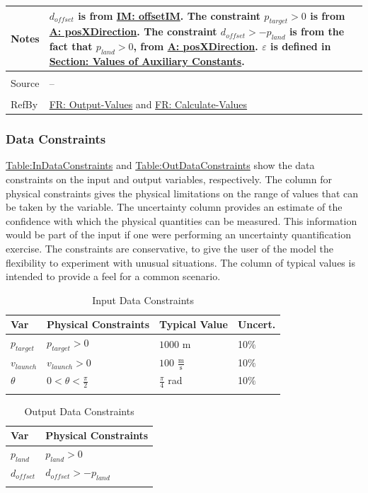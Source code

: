 \documentclass[12pt]{article}
\begin{document}
\begin{minipage}{\textwidth}
\begin{tabular}{p{} p{}}
Notes & ${d_{offset}}$ is from \hyperref[IM:offsetIM]{IM: offsetIM}.
        The constraint ${p_{target}}>0$ is from \hyperref[posXDirection]{A: posXDirection}.
        The constraint ${d_{offset}}>-{p_{land}}$ is from the fact that ${p_{land}}>0$, from \hyperref[posXDirection]{A: posXDirection}.
        $ε$ is defined in \hyperref[Sec:AuxConstants]{Section: Values of Auxiliary Constants}.
\\ \midrule \\
Source & --
\\ \midrule \\
RefBy & \hyperref[outputValues]{FR: Output-Values} and \hyperref[calcValues]{FR: Calculate-Values}
\\ \bottomrule \end{tabular}
\end{minipage}
\subsubsection{Data Constraints}
\label{Sec:DataConstraints}
\hyperref[Table:InDataConstraints]{Table:InDataConstraints} and \hyperref[Table:OutDataConstraints]{Table:OutDataConstraints} show the data constraints on the input and output variables, respectively. The column for physical constraints gives the physical limitations on the range of values that can be taken by the variable. The uncertainty column provides an estimate of the confidence with which the physical quantities can be measured. This information would be part of the input if one were performing an uncertainty quantification exercise. The constraints are conservative, to give the user of the model the flexibility to experiment with unusual situations. The column of typical values is intended to provide a feel for a common scenario.
\begin{longtable}{l l l l}
\toprule
Var & Physical Constraints & Typical Value & Uncert.
\\
\midrule
\endhead
${p_{target}}$ & ${p_{target}}>0$ & $1000$ m & 10$\%$
\\
${v_{launch}}$ & ${v_{launch}}>0$ & $100$ $\frac{\text{m}}{\text{s}}$ & 10$\%$
\\
$θ$ & $0<θ<\frac{π}{2}$ & $\frac{π}{4}$ rad & 10$\%$
\\
\bottomrule
\caption{Input Data Constraints}
\label{Table:InDataConstraints}
\end{longtable}
\begin{longtable}{l l}
\toprule
Var & Physical Constraints
\\
\midrule
\endhead
${p_{land}}$ & ${p_{land}}>0$
\\
${d_{offset}}$ & ${d_{offset}}>-{p_{land}}$
\\
\bottomrule
\caption{Output Data Constraints}
\label{Table:OutDataConstraints}
\end{longtable}
\end{document}
